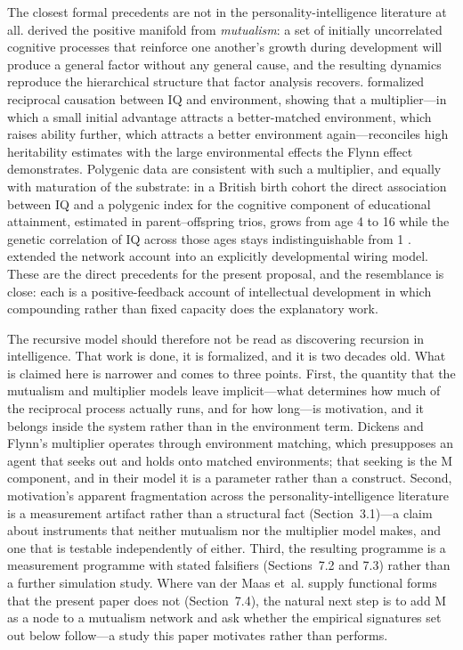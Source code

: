 \documentclass[12pt,a4paper]{article}
\begin{document}
The closest formal precedents are not in the personality-intelligence literature at all.  derived the positive manifold from \emph{mutualism}: a set of initially uncorrelated cognitive processes that reinforce one another's growth during development will produce a general factor without any general cause, and the resulting dynamics reproduce the hierarchical structure that factor analysis recovers.  formalized reciprocal causation between IQ and environment, showing that a multiplier---\hspace{0pt}in which a small initial advantage attracts a better-matched environment, which raises ability further, which attracts a better environment again---\hspace{0pt}reconciles high heritability estimates with the large environmental effects the Flynn effect demonstrates. Polygenic data are consistent with such a multiplier, and equally with maturation of the substrate: in a British birth cohort the direct association between IQ and a polygenic index for the cognitive component of educational attainment, estimated in parent--offspring trios, grows from age 4 to 16 while the genetic correlation of IQ across those ages stays indistinguishable from 1 \citep{Malawsky2026}.  extended the network account into an explicitly developmental wiring model. These are the direct precedents for the present proposal, and the resemblance is close: each is a positive-feedback account of intellectual development in which compounding rather than fixed capacity does the explanatory work.

The recursive model should therefore not be read as discovering recursion in intelligence. That work is done, it is formalized, and it is two decades old. What is claimed here is narrower and comes to three points. First, the quantity that the mutualism and multiplier models leave implicit---\hspace{0pt}what determines how much of the reciprocal process actually runs, and for how long---\hspace{0pt}is motivation, and it belongs inside the system rather than in the environment term. Dickens and Flynn's multiplier operates through environment matching, which presupposes an agent that seeks out and holds onto matched environments; that seeking is the M component, and in their model it is a parameter rather than a construct. Second, motivation's apparent fragmentation across the personality-intelligence literature is a measurement artifact rather than a structural fact (Section~3.1)---\hspace{0pt}a claim about instruments that neither mutualism nor the multiplier model makes, and one that is testable independently of either. Third, the resulting programme is a measurement programme with stated falsifiers (Sections~7.2 and 7.3) rather than a further simulation study. Where van der Maas et~al. supply functional forms that the present paper does not (Section~7.4), the natural next step is to add M as a node to a mutualism network and ask whether the empirical signatures set out below follow---\hspace{0pt}a study this paper motivates rather than performs.
\end{document}
